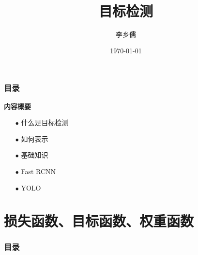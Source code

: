 \documentclass{beamer}%
\title[目标检测]{目标检测}
\author{\large 李乡儒} %
\institute[SCNU]{\small
华南师范大学计算机学院
}
\date{\today}
\begin{document}
\graphicspath{{figures/}}

\begin{frame}%
    \titlepage
\end{frame}

\begin{frame}[allowframebreaks]
    \frametitle{\textsc{目录}} \vspace{-0.3cm}
    \begin{spacing}{0.0}
        \tableofcontents[hideallsubsections]
    \end{spacing}   %
\end{frame}

\begin{frame}[allowframebreaks]
    \vspace{-0.2cm}
    {\noindent\large\textbf{内容概要}}
    \vspace{0.4cm}
    \begin{itemize}
        \item[$ \bullet $] 什么是目标检测
        \item[$ \bullet $] 如何表示
        \item[$ \bullet $] 基础知识
        \item[$ \bullet $] Fast RCNN
        \item[$ \bullet $] YOLO
    \end{itemize}

\end{frame}








\section{损失函数、目标函数、权重函数}

\begin{frame}[allowframebreaks]
    \frametitle{\textsc{目录}} \vspace{-0.3cm}
    \begin{spacing}{0.0}
    \end{spacing}   %
\end{frame}
\end{document}

